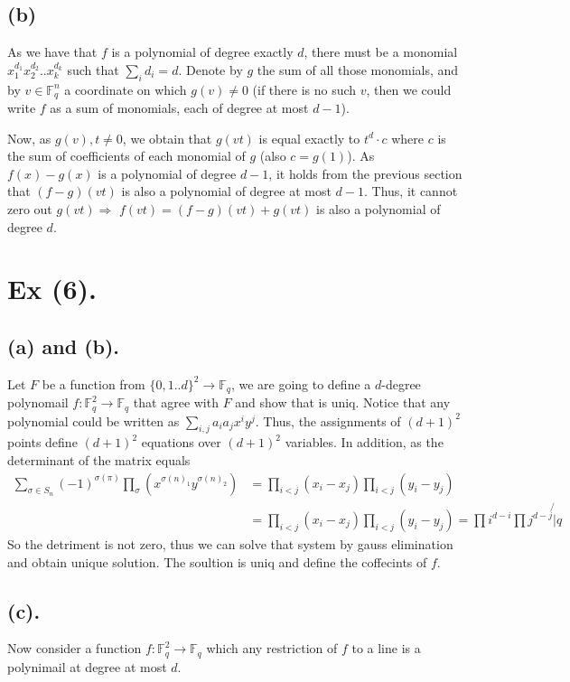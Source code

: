 \documentclass{article}
\newcommand{\FF}{\mathbb{F}}
\begin{document}
\subsection{(b)} As we have that $f$ is a polynomial of degree exactly $d$, there must be a monomial $x_{1}^{d_{1}}x_{2}^{d_{2}}..x_{k}^{d_{k}}$ such that $\sum_{i}{d_{i}} = d$. Denote by $g$ the sum of all those monomials, and by $v \in \FF_{q}^{n}$ a coordinate on which $g(v) \neq 0$ (if there is no such $v$, then we could write $f$ as a sum of monomials, each of degree at most $d-1$).

Now, as $g(v),t \neq 0$, we obtain that $g(vt)$ is equal exactly to $t^{d}\cdot c$ where $c$ is the sum of coefficients of each monomial of $g$ (also $c = g(1)$). As $f(x) - g(x)$ is a polynomial of degree $d-1$, it holds from the previous section that $(f-g)(vt)$ is also a polynomial of degree at most $d-1$. Thus, it cannot zero out $g(vt) \Rightarrow$ $f(vt) = (f - g)(vt) + g(vt)$ is also a polynomial of degree $d$.        

\section{Ex (6).}
\subsection{(a) and (b).} Let $F$ be a function from $ \{0,1.. d \}^{2} \rightarrow \FF_{q}$, we are going to define a $d$-degree polynomail $f : \FF_{q}^{2}\rightarrow \FF_{q}$  that agree with $F$ and show that is uniq. Notice that any polynomial could be written as $\sum_{i,j}{a_{i}a_{j}x^{i}y^{j}}$. Thus, the assignments of $(d+1)^{2}$ points define $(d+1)^{2}$ equations over $(d+1)^{2}$ variables. In addition, as the determinant of the matrix equals
\begin{equation}
  \begin{split}
  \sum_{\sigma \in S_{n}}{ \left( -1 \right)^{\sigma(\pi)}\prod_{\sigma}{( x^{\sigma(n)_{1}}y^{\sigma(n)_{2}}  ) } } &= \prod_{i<j}{\left(x_{i} - x_{j}  \right)}\prod_{i<j}\left(y_{i} -y_{j} \right) \\
  &= \prod_{i<j}{\left(x_{i} - x_{j}  \right)}\prod_{i<j}\left(y_{i} -y_{j} \right) = \prod{i^{d-i}}\prod{j^{d-j}} \not{|} q
\end{split}
\end{equation}
So the detriment is not zero, thus we can solve that system by gauss elimination and obtain unique solution. The soultion is uniq and define the coffecints of $f$.  

\subsection{(c).}

Now consider a function $f : \FF_{q}^{2} \rightarrow \FF_{q}$ which any restriction of $f$ to a line is a polynimail at degree at most $d$.   


  \printbibliography 
\end{document}
